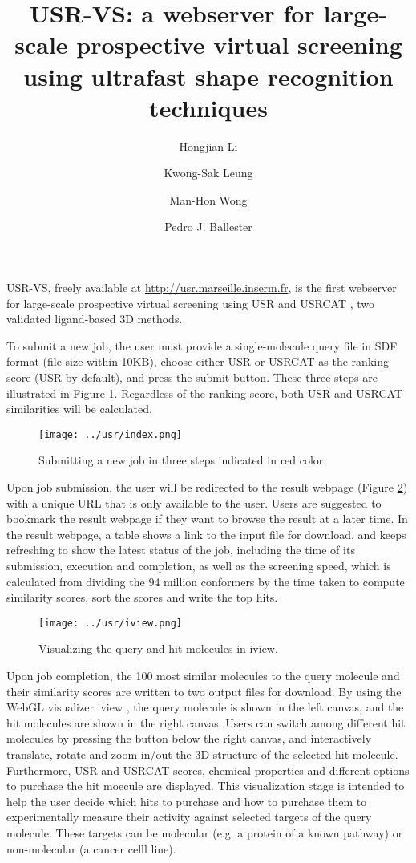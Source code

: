 \documentclass[a4paper,11pt]{article}
\title{USR-VS: a webserver for large-scale prospective virtual screening using ultrafast shape recognition techniques}
\author[1]{Hongjian Li}
\author[1]{Kwong-Sak Leung}
\author[1]{Man-Hon Wong}
\author[2]{Pedro J. Ballester}
\affil[1]{Department of Computer Science and Engineering, Chinese University of Hong Kong.}
\affil[ ]{\{hjli,ksleung,mhwong\}@cse.cuhk.edu.hk}
\affil[2]{Cancer Research Center of Marseille, INSERM U1068; Institut Paoli-Calmettes; Aix-Marseille Universit\'{e}; CNRS UMR7258, Marseille, France.}
\affil[ ]{pedro.ballester@inserm.fr}
\begin{document}
\maketitle
\thispagestyle{title}

USR-VS, freely available at \url{http://usr.marseille.inserm.fr}, is the first webserver for large-scale prospective virtual screening using USR \cite{1379} and USRCAT \cite{1331}, two validated ligand-based 3D methods.

To submit a new job, the user must provide a single-molecule query file in SDF format (file size within 10KB), choose either USR or USRCAT as the ranking score (USR by default), and press the submit button. These three steps are illustrated in Figure \ref{index}. Regardless of the ranking score, both USR and USRCAT similarities will be calculated.

\begin{figure}
\texttt{[image: ../usr/index.png]}
\caption{Submitting a new job in three steps indicated in red color.}
\label{index}
\end{figure}

Upon job submission, the user will be redirected to the result webpage (Figure \ref{iview}) with a unique URL that is only available to the user. Users are suggested to bookmark the result webpage if they want to browse the result at a later time. In the result webpage, a table shows a link to the input file for download, and keeps refreshing to show the latest status of the job, including the time of its submission, execution and completion, as well as the screening speed, which is calculated from dividing the 94 million conformers by the time taken to compute similarity scores, sort the scores and write the top hits.

\begin{figure}
\texttt{[image: ../usr/iview.png]}
\caption{Visualizing the query and hit molecules in iview.}
\label{iview}
\end{figure}

Upon job completion, the 100 most similar molecules to the query molecule and their similarity scores are written to two output files for download. By using the WebGL visualizer iview \cite{1366}, the query molecule is shown in the left canvas, and the hit molecules are shown in the right canvas. Users can switch among different hit molecules by pressing the button below the right canvas, and interactively translate, rotate and zoom in/out the 3D structure of the selected hit molecule. Furthermore, USR and USRCAT scores, chemical properties and different options to purchase the hit moecule are displayed. This visualization stage is intended to help the user decide which hits to purchase and how to purchase them to experimentally measure their activity against selected targets of the query molecule. These targets can be molecular (e.g. a protein of a known pathway) or non-molecular (a cancer celll line).



\end{document}
